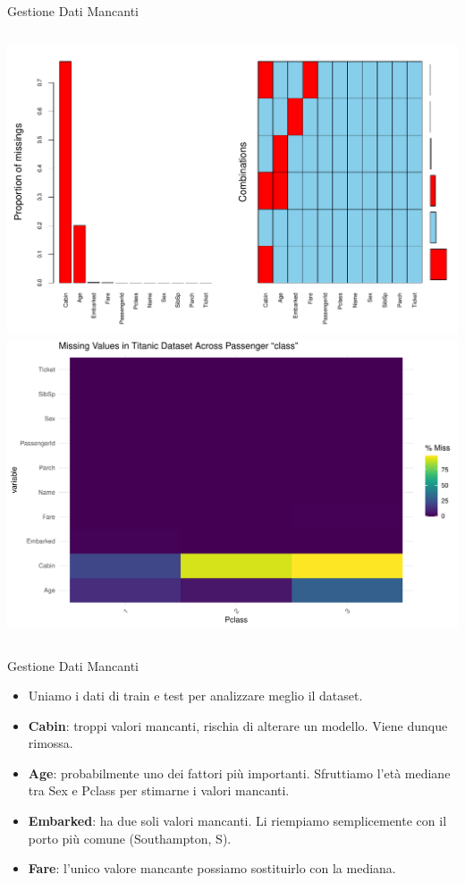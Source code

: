 \documentclass[9pt, xcolor=table]{beamer}
\begin{document}
	\begin{frame}{Gestione Dati Mancanti}
			\begin{columns}
			\centering
			\includegraphics[scale=0.26]{missing-data-prop}
			\centering
			\includegraphics[scale=0.26]{missing-data-pclass}
		\end{columns}		
	\end{frame}

	\begin{frame}{Gestione Dati Mancanti}
		\begin{itemize}
			\item Uniamo i dati di train e test per analizzare meglio il dataset.
			\item \textbf{Cabin}: troppi valori mancanti, rischia di alterare un modello.
			Viene dunque rimossa.
			\item \textbf{Age}: probabilmente uno dei fattori più importanti. Sfruttiamo l'età mediane tra Sex e Pclass per stimarne i valori mancanti.
			
			
			
			\item \textbf{Embarked}: ha due soli valori mancanti. Li riempiamo
			semplicemente con il porto più comune (Southampton, S).
			\item \textbf{Fare}: l'unico valore mancante possiamo sostituirlo con la
			mediana.
		\end{itemize}
	\end{frame}
\end{document}

